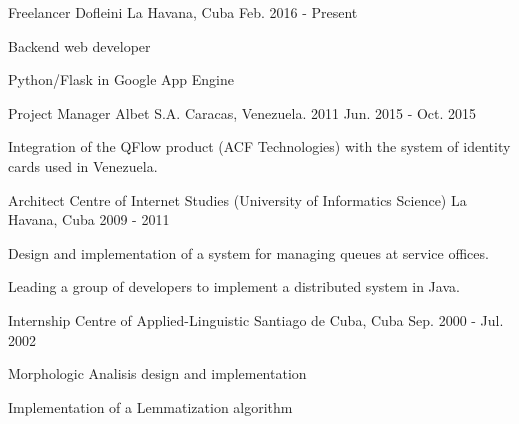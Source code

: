 


\begin{cventries}


\cventry
{Freelancer} %
{Dofleini} %
{La Havana, Cuba} %
{Feb. 2016 - Present} %
{ %
\begin{cvitems}
\item {Backend web developer}
\item {Python/Flask in Google App Engine}
\end{cvitems}
}


\cventry
{Project Manager} %
{Albet S.A.} %
{Caracas, Venezuela. 2011} %
{Jun. 2015 - Oct. 2015} %
{ %
\begin{cvitems}
\item {Integration of the QFlow product (ACF Technologies) with the system of identity cards used in Venezuela.}
\end{cvitems}
}


\cventry
{Architect} %
{Centre of Internet Studies (University of Informatics Science)} %
{La Havana, Cuba} %
{2009 - 2011} %
{ %
\begin{cvitems}
\item {Design and implementation of a system for managing queues at service offices.}
\item {Leading a group of developers to implement a distributed system in Java.}
\end{cvitems} 
}


\cventry
{Internship} %
{Centre of Applied-Linguistic} %
{Santiago de Cuba, Cuba} %
{Sep. 2000 - Jul. 2002} %
{ %
\begin{cvitems}
\item {Morphologic Analisis design and implementation}
\item {Implementation of a Lemmatization algorithm}
\end{cvitems}
}


\end{cventries}

